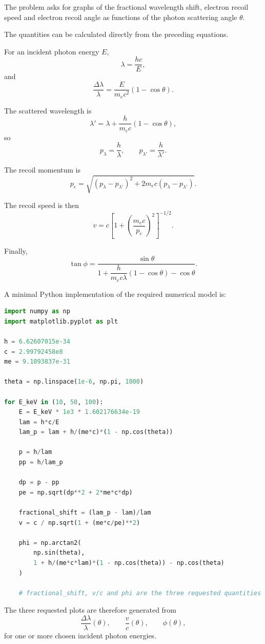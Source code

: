 \documentclass[11pt,a4paper]{article}
\begin{document}
The problem asks for graphs of the fractional wavelength shift,
electron recoil speed and electron recoil angle as functions of the photon
scattering angle $\theta$.

The quantities can be calculated directly from the preceding equations.

For an incident photon energy $E$,
\[
\lambda=\frac{hc}{E},
\]
and
\[
\boxed{
\frac{\Delta\lambda}{\lambda}
=
\frac{E}{m_ec^2}(1-\cos\theta)
}.
\]

The scattered wavelength is
\[
\lambda'
=
\lambda+\frac{h}{m_ec}(1-\cos\theta),
\]
so
\[
p_\lambda=\frac h\lambda,
\qquad
p_{\lambda'}=\frac h{\lambda'}.
\]

The recoil momentum is
\[
\boxed{
p_e
=
\sqrt{
(p_\lambda-p_{\lambda'})^2
+
2m_ec(p_\lambda-p_{\lambda'})
}
}.
\]

The recoil speed is then
\[
\boxed{
v
=
c\left[
1+\left(\frac{m_ec}{p_e}\right)^2
\right]^{-1/2}
}.
\]

Finally,
\[
\boxed{
\tan\phi
=
\frac{\sin\theta}
{1+\dfrac{h}{m_ec\lambda}(1-\cos\theta)-\cos\theta}
}.
\]

A minimal Python implementation of the required numerical model is:

\begin{lstlisting}[language=Python,basicstyle=\ttfamily\small,frame=single]
import numpy as np
import matplotlib.pyplot as plt

h = 6.62607015e-34
c = 2.99792458e8
me = 9.1093837e-31

theta = np.linspace(1e-6, np.pi, 1000)

for E_keV in (10, 50, 100):
    E = E_keV * 1e3 * 1.602176634e-19
    lam = h*c/E
    lam_p = lam + h/(me*c)*(1 - np.cos(theta))

    p = h/lam
    pp = h/lam_p

    dp = p - pp
    pe = np.sqrt(dp**2 + 2*me*c*dp)

    fractional_shift = (lam_p - lam)/lam
    v = c / np.sqrt(1 + (me*c/pe)**2)

    phi = np.arctan2(
        np.sin(theta),
        1 + h/(me*c*lam)*(1 - np.cos(theta)) - np.cos(theta)
    )

    # fractional_shift, v/c and phi are the three requested quantities
\end{lstlisting}

The three requested plots are therefore generated from
\[
\frac{\Delta\lambda}{\lambda}(\theta),
\qquad
\frac{v}{c}(\theta),
\qquad
\phi(\theta),
\]
for one or more chosen incident photon energies.
\end{document}
